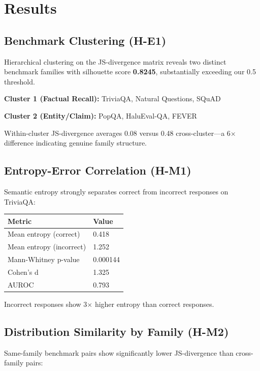 \section{Results}

\subsection{Benchmark Clustering (H-E1)}

Hierarchical clustering on the JS-divergence matrix reveals two distinct benchmark families with silhouette score \textbf{0.8245}, substantially exceeding our 0.5 threshold.

\textbf{Cluster 1 (Factual Recall):} TriviaQA, Natural Questions, SQuAD

\textbf{Cluster 2 (Entity/Claim):} PopQA, HaluEval-QA, FEVER

Within-cluster JS-divergence averages 0.08 versus 0.48 cross-cluster---a 6$\times$ difference indicating genuine family structure.

\subsection{Entropy-Error Correlation (H-M1)}

Semantic entropy strongly separates correct from incorrect responses on TriviaQA:

\begin{table}[h]
\centering
\begin{tabular}{@{}ll@{}}
\toprule
Metric & Value \\
\midrule
Mean entropy (correct) & 0.418 \\
Mean entropy (incorrect) & 1.252 \\
Mann-Whitney p-value & 0.000144 \\
Cohen's d & 1.325 \\
AUROC & 0.793 \\
\bottomrule
\end{tabular}
\end{table}

Incorrect responses show 3$\times$ higher entropy than correct responses.

\subsection{Distribution Similarity by Family (H-M2)}

Same-family benchmark pairs show significantly lower JS-divergence than cross-family pairs:

